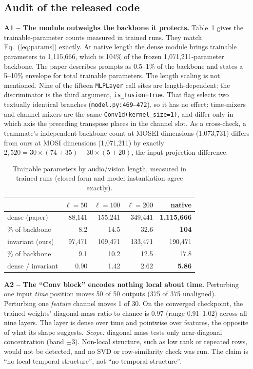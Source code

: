 \documentclass[lettersize,journal]{IEEEtran}
\begin{document}
\subsection{Audit of the released code}\label{sec:audit}
\textbf{A1 -- The module outweighs the backbone it protects.} Table~\ref{tab:params} gives the trainable-parameter counts measured in trained runs. They match Eq.~(\ref{eq:params}) exactly. At native length the dense module brings trainable parameters to 1,115,666, which is 104\% of the frozen 1,071,211-parameter backbone. The paper describes prompts as 0.5--1\% of the backbone and states a 5--10\% envelope for total trainable parameters. The length scaling is not mentioned. Nine of the fifteen \texttt{MLPLayer} call sites are length-dependent; the discriminator is the third argument, \texttt{is\_Fusion=True}. That flag selects two textually identical branches (\texttt{model.py:469--472}), so it has no effect: time-mixers and channel mixers are the same \texttt{Conv1d(kernel\_size=1)}, and differ only in which axis the preceding transpose places in the channel slot. As a cross-check, a teammate's independent backbone count at MOSEI dimensions (1,073,731) differs from ours at MOSI dimensions (1,071,211) by exactly $2{,}520 = 30\times(74+35)-30\times(5+20)$, the input-projection difference.

\begin{table}[!t]
\caption{Trainable parameters by audio/vision length, measured in trained runs (closed form and model instantiation agree exactly).\label{tab:params}}
\centering
\begin{tabular}{lrrrr}
\toprule
 & $\ell=50$ & $\ell=100$ & $\ell=200$ & native \\
\midrule
dense (paper) & 88,141 & 155,241 & 349,441 & \textbf{1,115,666}\\
\quad \% of backbone & 8.2 & 14.5 & 32.6 & \textbf{104}\\
invariant (ours) & 97,471 & 109,471 & 133,471 & 190,471\\
\quad \% of backbone & 9.1 & 10.2 & 12.5 & 17.8\\
dense / invariant & 0.90 & 1.42 & 2.62 & \textbf{5.86}\\
\bottomrule
\end{tabular}
\end{table}

\textbf{A2 -- The ``Conv block'' encodes nothing local about time.} Perturbing one input \emph{time} position moves 50 of 50 outputs (375 of 375 unaligned). Perturbing one \emph{feature} channel moves 1 of 30. On the converged checkpoint, the trained weights' diagonal-mass ratio to chance is 0.97 (range 0.91--1.02) across all nine layers. The layer is dense over time and pointwise over features, the opposite of what its shape suggests. \emph{Scope:} diagonal mass tests only near-diagonal concentration (band $\pm3$). Non-local structure, such as low rank or repeated rows, would not be detected, and no SVD or row-similarity check was run. The claim is ``no local temporal structure'', not ``no temporal structure''.
\end{document}
